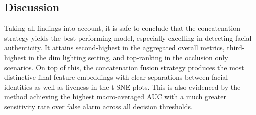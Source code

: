 \documentclass{mpaper}
\begin{document}
\begin{table}[htbp]
    \centering
    \vspace{0.1cm}
    \vspace{0.1cm}
    \caption{Averaged accuracy and $F_{0.5}$ score for the seven fusion strategies and individual modalities against the \textbf{occlusion} scenarios only. Equal weighting is applied to subject and liveness predictions.}
    \label{tab:occlusion_averaged_acc_fb}
\end{table}


\subsection{Discussion}
Taking all findings into account, it is safe to conclude that the concatenation strategy yields the best performing model, especially excelling in detecting facial authenticity. It attains second-highest in the aggregated overall metrics, third-highest in the dim lighting setting, and top-ranking in the occlusion only scenarios. On top of this, the concatenation fusion strategy produces the most distinctive final feature embeddings with clear separations between facial identities as well as liveness in the t-SNE plots. This is also evidenced by the method achieving the highest macro-averaged AUC with a much greater sensitivity rate over false alarm across all decision thresholds. 
\end{document}

